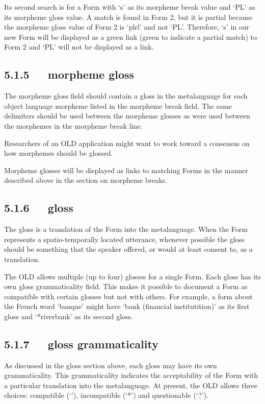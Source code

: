\documentclass[letterpaper,10pt,english]{sphinxmanual}
\begin{document}
Its second search is for a Form with `s' as its morpheme break value and `PL' as
its morpheme gloss value.  A match is found in Form 2, but it is partial because
the morpheme gloss value of Form 2 is `plrl' and not `PL'.  Therefore, `s' in
our new Form will be displayed as a green link (green to indicate a partial
match) to Form 2 and `PL' will not be displayed as a link.


\subsection{5.1.5   morpheme gloss}
\label{user_guide:morpheme-gloss}
The morpheme gloss field should contain a gloss in the metalanguage for each
object language morpheme listed in the morpheme break field.  The same
delimiters should be used between the morpheme glosses as were used between the
morphemes in the morpheme break line.

Researchers of an OLD application might want to work toward a consensus on how
morphemes should be glossed.

Morpheme glosses will be displayed as links to matching Forms in the manner
described above in the section on morpheme breaks.


\subsection{5.1.6   gloss}
\label{user_guide:gloss}
The gloss is a translation of the Form into the metalanguage.  When the Form
represents a spatio-temporally located utterance, whenever possible the gloss
should be something that the speaker offered, or would at least consent to, as a
translation.

The OLD allows multiple (up to four) glosses for a single Form.  Each gloss has
its own gloss grammaticality field.  This makes it possible to document a Form
as compatible with certain glosses but not with others.  For example, a form
about the French word `banque' might have `bank (financial institutition)' as
its first gloss and `*riverbank' as its second gloss.


\subsection{5.1.7   gloss grammaticality}
\label{user_guide:gloss-grammaticality}
As discussed in the gloss section above, each gloss may have its own
grammaticality.  This grammaticality indicates the acceptability of the Form
with a particular translation into the metalanguage.  At present, the OLD allows
three choices: compatible (`'), incompatible (`*') and questionable (`?').
\end{document}
